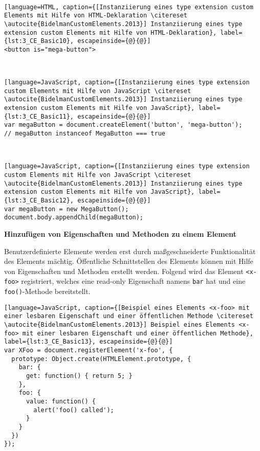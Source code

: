 \begin{enumerate}
 \hfill \\
\begin{lstlisting}[language=HTML, caption={[Instanziierung eines type extension custom Elements mit Hilfe von HTML-Deklaration \citereset \autocite{BidelmanCustomElements.2013}] Instanziierung eines type extension custom Elements mit Hilfe von HTML-Deklaration}, label={lst:3_CE_Basic10}, escapeinside={@}{@}]
<button is="mega-button">
\end{lstlisting}

 \hfill \\
\begin{lstlisting}[language=JavaScript, caption={[Instanziierung eines type extension custom Elements mit Hilfe von JavaScript \citereset \autocite{BidelmanCustomElements.2013}] Instanziierung eines type extension custom Elements mit Hilfe von JavaScript}, label={lst:3_CE_Basic11}, escapeinside={@}{@}]
var megaButton = document.createElement('button', 'mega-button');
// megaButton instanceof MegaButton === true
\end{lstlisting}

 \hfill \\
\begin{lstlisting}[language=JavaScript, caption={[Instanziierung eines type extension custom Elements mit Hilfe von JavaScript \citereset \autocite{BidelmanCustomElements.2013}] Instanziierung eines type extension custom Elements mit Hilfe von JavaScript}, label={lst:3_CE_Basic12}, escapeinside={@}{@}]
var megaButton = new MegaButton();
document.body.appendChild(megaButton);
\end{lstlisting}
\end{enumerate}

\textbf{Hinzufügen von Eigenschaften und Methoden zu einem Element}

Benutzerdefinierte Elemente werden erst durch maßgeschneiderte Funktionalität des Elements mächtig. Öffentliche Schnittstellen des Elements können mit Hilfe von Eigenschaften und Methoden erstellt werden. Folgend wird das Element \lstinline|<x-foo>| registriert, welches eine read-only Eigenschaft namens \lstinline|bar| hat und eine \lstinline|foo()|-Methode bereitstellt.

\begin{lstlisting}[language=JavaScript, caption={[Beispiel eines Elements <x-foo> mit einer lesbaren Eigenschaft und einer öffentlichen Methode \citereset \autocite{BidelmanCustomElements.2013}] Beispiel eines Elements <x-foo> mit einer lesbaren Eigenschaft und einer öffentlichen Methode}, label={lst:3_CE_Basic13}, escapeinside={@}{@}]
var XFoo = document.registerElement('x-foo', {
  prototype: Object.create(HTMLElement.prototype, {
    bar: {
      get: function() { return 5; }
    },
    foo: {
      value: function() {
        alert('foo() called');
      }
    }
  })
});
\end{lstlisting}

